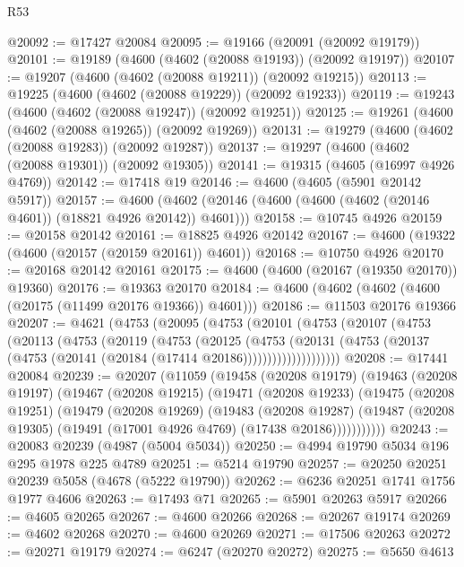 \begin{lexlean}{R53}
\begin{coremodule}
@20092 := @17427 @20084
@20095 := @19166 (@20091 (@20092 @19179))
@20101 := @19189 (@4600 (@4602 (@20088 @19193)) (@20092 @19197))
@20107 := @19207 (@4600 (@4602 (@20088 @19211)) (@20092 @19215))
@20113 := @19225 (@4600 (@4602 (@20088 @19229)) (@20092 @19233))
@20119 := @19243 (@4600 (@4602 (@20088 @19247)) (@20092 @19251))
@20125 := @19261 (@4600 (@4602 (@20088 @19265)) (@20092 @19269))
@20131 := @19279 (@4600 (@4602 (@20088 @19283)) (@20092 @19287))
@20137 := @19297 (@4600 (@4602 (@20088 @19301)) (@20092 @19305))
@20141 := @19315 (@4605 (@16997 @4926 @4769))
@20142 := @17418 @19
@20146 := @4600 (@4605 (@5901 @20142 @5917))
@20157 := @4600 (@4602 (@20146 (@4600 (@4600 (@4602 (@20146 @4601)) (@18821 @4926 @20142)) @4601)))
@20158 := @10745 @4926
@20159 := @20158 @20142
@20161 := @18825 @4926 @20142
@20167 := @4600 (@19322 (@4600 (@20157 (@20159 @20161)) @4601))
@20168 := @10750 @4926
@20170 := @20168 @20142 @20161
@20175 := @4600 (@4600 (@20167 (@19350 @20170)) @19360)
@20176 := @19363 @20170
@20184 := @4600 (@4602 (@4602 (@4600 (@20175 (@11499 @20176 @19366)) @4601)))
@20186 := @11503 @20176 @19366
@20207 := @4621
    (@4753
      (@20095
        (@4753
          (@20101
            (@4753
              (@20107
                (@4753
                  (@20113
                    (@4753
                      (@20119
                        (@4753
                          (@20125
                            (@4753
                              (@20131
                                (@4753
                                  (@20137 (@4753 (@20141 (@20184 (@17414 @20186))))))))))))))))))))
@20208 := @17441 @20084
@20239 := @20207
    (@11059
      (@19458
        (@20208 @19179)
        (@19463
          (@20208 @19197)
          (@19467
            (@20208 @19215)
            (@19471
              (@20208 @19233)
              (@19475
                (@20208 @19251)
                (@19479
                  (@20208 @19269)
                  (@19483
                    (@20208 @19287)
                    (@19487 (@20208 @19305) (@19491 (@17001 @4926 @4769) (@17438 @20186)))))))))))
@20243 := @20083 @20239 (@4987 (@5004 @5034))
@20250 := @4994 @19790 @5034 @196 @295 @1978 @225 @4789
@20251 := @5214 @19790
@20257 := @20250 @20251 @20239 @5058 (@4678 (@5222 @19790))
@20262 := @6236 @20251 @1741 @1756 @1977 @4606
@20263 := @17493 @71
@20265 := @5901 @20263 @5917
@20266 := @4605 @20265
@20267 := @4600 @20266
@20268 := @20267 @19174
@20269 := @4602 @20268
@20270 := @4600 @20269
@20271 := @17506 @20263
@20272 := @20271 @19179
@20274 := @6247 (@20270 @20272)
@20275 := @5650 @4613

\end{coremodule}
\end{lexlean}
